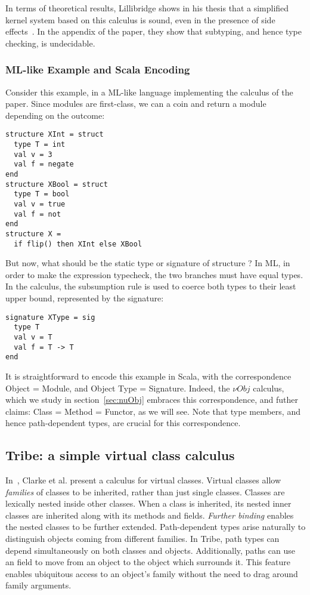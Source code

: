 \documentclass[10pt,journal,a4paper]{IEEEtran}
\begin{document}
In terms of theoretical results, Lillibridge shows in his thesis that
a simplified kernel system based on this calculus is sound, even in
the presence of side effects~\cite{lillibridge:thesis}. In the
appendix of the paper, they show that subtyping, and hence type
checking, is undecidable.

\subsubsection*{ML-like Example and Scala Encoding}
Consider this example, in a ML-like language implementing the calculus
of the paper. Since modules are first-class, we can  a coin
and return a module depending on the outcome:
\begin{lstlisting}
structure XInt = struct
  type T = int
  val v = 3
  val f = negate
end
structure XBool = struct
  type T = bool
  val v = true
  val f = not
end
structure X =
  if flip() then XInt else XBool
\end{lstlisting}
But now, what should be the static type or signature of structure
? In ML, in order to make the  expression typecheck, the two
branches must have equal types. In the calculus, the subsumption rule
is used to coerce both types to their least upper bound, represented
by the signature:
\begin{lstlisting}
signature XType = sig
  type T
  val v = T
  val f = T -> T
end
\end{lstlisting}

It is straightforward to encode this example in Scala, with the
correspondence Object = Module, and Object Type = Signature. Indeed,
the ${\nu}Obj$ calculus, which we study in section~\ref{sec:nuObj}
embraces this correspondence, and futher claims: Class = Method =
Functor, as we will see. Note that type members, and hence
path-dependent types, are crucial for this correspondence.


\subsection{Tribe: a simple virtual class calculus}\label{sec:tribe}

In~\cite{tribe}, Clarke et al. present a calculus for virtual
classes. Virtual classes allow {\it families} of classes to be
inherited, rather than just single classes. Classes are lexically
nested inside other classes. When a class is inherited, its nested
inner classes are inherited along with its methods and fields. {\it
  Further binding} enables the nested classes to be further
extended. Path-dependent types arise naturally to distinguish objects
coming from different families. In Tribe, path types can depend
simultaneously on both classes and objects. Additionally, paths can
use an  field to move from an object to the object which
surrounds it. This  feature enables ubiquitous access to an
object's family without the need to drag around family arguments.
\end{document}
